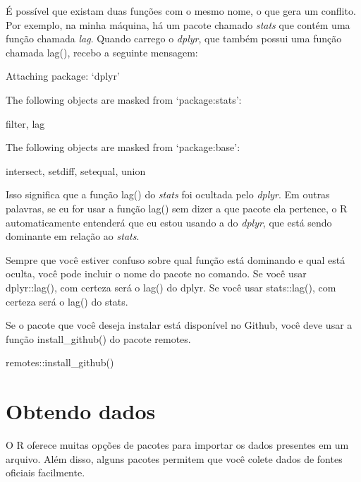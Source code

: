 \documentclass[
]{book}
\newenvironment{Shaded}{\begin{snugshade}}{\end{snugshade}}
\newcommand{\FunctionTok}[1]{\textcolor[rgb]{0.00,0.00,0.00}{#1}}
\newcommand{\NormalTok}[1]{#1}
\newcommand{\SpecialCharTok}[1]{\textcolor[rgb]{0.00,0.00,0.00}{#1}}
\begin{document}
É possível que existam duas funções com o mesmo nome, o que gera um conflito. Por exemplo, na minha máquina, há um pacote chamado \emph{stats} que contém uma função chamada \emph{lag}. Quando carrego o \emph{dplyr}, que também possui uma função chamada lag(), recebo a seguinte mensagem:

\begin{Shaded}
\begin{Highlighting}[]
\NormalTok{Attaching package}\SpecialCharTok{:}\NormalTok{ ‘dplyr’}

\NormalTok{The following objects are masked from ‘package}\SpecialCharTok{:}\NormalTok{stats’}\SpecialCharTok{:}

\NormalTok{    filter, lag}

\NormalTok{The following objects are masked from ‘package}\SpecialCharTok{:}\NormalTok{base’}\SpecialCharTok{:}

\NormalTok{    intersect, setdiff, setequal, union}
\end{Highlighting}
\end{Shaded}

Isso significa que a função lag() do \emph{stats} foi ocultada pelo \emph{dplyr}. Em outras palavras, se eu for usar a função lag() sem dizer a que pacote ela pertence, o R automaticamente entenderá que eu estou usando a do \emph{dplyr}, que está sendo dominante em relação ao \emph{stats}.

Sempre que você estiver confuso sobre qual função está dominando e qual está oculta, você pode incluir o nome do pacote no comando. Se você usar dplyr::lag(), com certeza será o lag() do dplyr. Se você usar stats::lag(), com certeza será o lag() do stats.

Se o pacote que você deseja instalar está disponível no Github, você deve usar a função install\_github() do pacote remotes.

\begin{Shaded}
\begin{Highlighting}[]
\NormalTok{remotes}\SpecialCharTok{::}\FunctionTok{install\_github}\NormalTok{()}
\end{Highlighting}
\end{Shaded}

\hypertarget{obtendo-dados}{%
\chapter{Obtendo dados}\label{obtendo-dados}}

O R oferece muitas opções de pacotes para importar os dados presentes em um arquivo. Além disso, alguns pacotes permitem que você colete dados de fontes oficiais facilmente.
\end{document}
